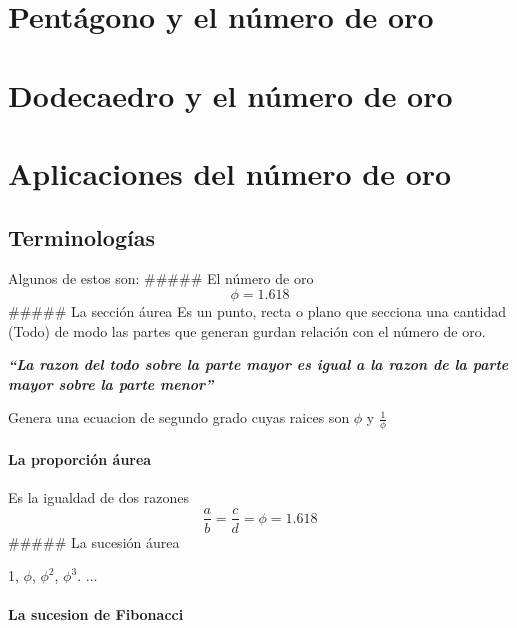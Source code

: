 \documentclass[
  11pt,
]{krantz}
\theoremstyle{definition}
\theoremstyle{definition}
\theoremstyle{definition}
\theoremstyle{definition}
\theoremstyle{remark}
\begin{document}
\hypertarget{pentuxe1gono-y-el-nuxfamero-de-oro}{%
\section{Pentágono y el número de oro}\label{pentuxe1gono-y-el-nuxfamero-de-oro}}

\hypertarget{dodecaedro-y-el-nuxfamero-de-oro}{%
\section{Dodecaedro y el número de oro}\label{dodecaedro-y-el-nuxfamero-de-oro}}

\hypertarget{aplicaciones-del-nuxfamero-de-oro}{%
\section{Aplicaciones del número de oro}\label{aplicaciones-del-nuxfamero-de-oro}}

\hypertarget{terminologuxedas}{%
\subsection{Terminologías}\label{terminologuxedas}}

Algunos de estos son:
\#\#\#\#\# El número de oro
\[\phi=1.618\]
\#\#\#\#\# La sección áurea
Es un punto, recta o plano que secciona una cantidad (Todo) de modo las partes que generan gurdan relación con el número de oro.

\textbf{\emph{``La razon del todo sobre la parte mayor es igual a la razon de la parte mayor sobre la parte menor''}}

Genera una ecuacion de segundo grado cuyas raices son \(\phi\) y \(\frac{1}{\phi}\)

\hypertarget{la-proporciuxf3n-uxe1urea}{%
\paragraph{La proporción áurea}\label{la-proporciuxf3n-uxe1urea}}

Es la igualdad de dos razones \[\frac{a}{b}=\frac{c}{d}=\phi=1.618\]
\#\#\#\#\# La sucesión áurea

1, \(\phi\), \(\phi^2\), \(\phi^3\). \(\ldots\)

\hypertarget{la-sucesion-de-fibonacci}{%
\paragraph{La sucesion de Fibonacci}\label{la-sucesion-de-fibonacci}}
\end{document}
